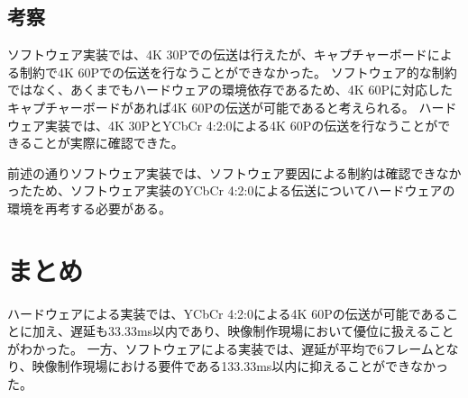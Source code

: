 \subsection{考察}
ソフトウェア実装では、4K 30Pでの伝送は行えたが、キャプチャーボードによる制約で4K 60Pでの伝送を行なうことができなかった。
ソフトウェア的な制約ではなく、あくまでもハードウェアの環境依存であるため、4K 60Pに対応したキャプチャーボードがあれば4K 60Pの伝送が可能であると考えられる。
ハードウェア実装では、4K 30PとYCbCr 4:2:0による4K 60Pの伝送を行なうことができることが実際に確認できた。

前述の通りソフトウェア実装では、ソフトウェア要因による制約は確認できなかったため、ソフトウェア実装のYCbCr 4:2:0による伝送についてハードウェアの環境を再考する必要がある。


\section{まとめ}

ハードウェアによる実装では、YCbCr 4:2:0による4K 60Pの伝送が可能であることに加え、遅延も33.33ms以内であり、映像制作現場において優位に扱えることがわかった。
一方、ソフトウェアによる実装では、遅延が平均で6フレームとなり、映像制作現場における要件である133.33ms以内に抑えることができなかった。
